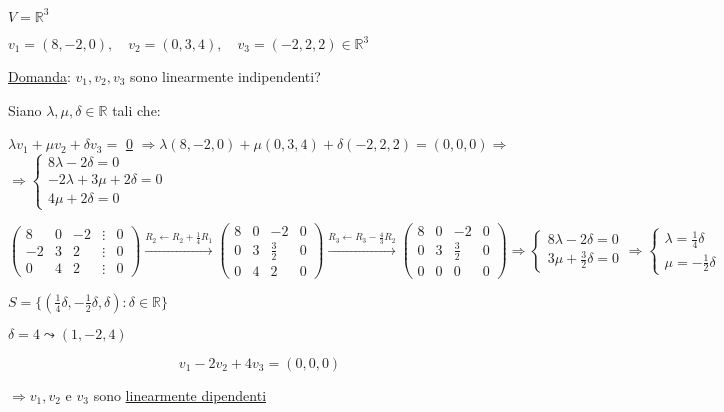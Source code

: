 \documentclass{article}
\newcommand{\ul}[1]{\underline{#1}}
\newcommand{\R}{\mathbb{R}}
\begin{document}
$V=\R^3$

$v_1=(8,-2,0),\quad v_2=(0,3,4),\quad v_3=(-2,2,2)\in\R^3$

\ul{Domanda}: $v_1,v_2,v_3$ sono linearmente indipendenti?

Siano $\lambda,\mu,\delta\in\R$ tali che:

$\lambda v_1+\mu v_2+\delta v_3=$ \ul{0} $\Rightarrow\lambda(8,-2,0)+\mu(0,3,4)+\delta(-2,2,2)=(0,0,0)\Rightarrow$
$\Rightarrow
	\begin{cases}
		8\lambda-2\delta=0       \\
		-2\lambda+3\mu+2\delta=0 \\
		4\mu+2\delta=0
	\end{cases}$

$\begin{pmatrix}
		8  & 0 & -2 & \vdots & 0 \\
		-2 & 3 & 2  & \vdots & 0 \\
		0  & 4 & 2  & \vdots & 0
	\end{pmatrix}\xrightarrow{R_2\leftarrow R_2+\frac{1}{4}R_1}
	\begin{pmatrix}
		8 & 0 & -2          & 0 \\
		0 & 3 & \frac{3}{2} & 0 \\
		0 & 4 & 2           & 0
	\end{pmatrix}\xrightarrow{R_3\leftarrow R_3-\frac{4}{3}R_2}
	\begin{pmatrix}
		8 & 0 & -2          & 0 \\
		0 & 3 & \frac{3}{2} & 0 \\
		0 & 0 & 0           & 0
	\end{pmatrix}\Rightarrow
	\begin{cases}
		8\lambda-2\delta=0 \\
		3\mu+\frac{3}{2}\delta=0
	\end{cases}\Rightarrow
	\begin{cases}
		\lambda=\frac{1}{4}\delta \\
		\mu=-\frac{1}{2}\delta
	\end{cases}$

$S=\{(\frac{1}{4}\delta,-\frac{1}{2}\delta,\delta):\delta\in\R\}$

$\delta=4\leadsto(1,-2,4)$

$$v_1-2v_2+4v_3=(0,0,0)$$

$\Rightarrow v_1,v_2$ e $v_3$ sono \ul{linearmente dipendenti}
\end{document}

